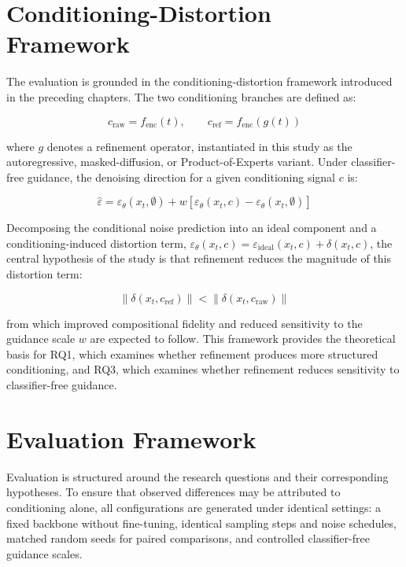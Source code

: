\documentclass[a4paper,twoside,12pt]{report}
\begin{document}
\section{Conditioning-Distortion Framework}
\label{sec:distortion}

The evaluation is grounded in the conditioning-distortion framework introduced
in the preceding chapters. The two conditioning branches are defined as:

\begin{equation}
c_{\mathrm{raw}} = f_{\mathrm{enc}}(t),
\qquad
c_{\mathrm{ref}} = f_{\mathrm{enc}}\!\left(g(t)\right)
\label{eq:conditioning_pair}
\end{equation}

where \(g\) denotes a refinement operator, instantiated in this study as the
autoregressive, masked-diffusion, or Product-of-Experts variant. Under
classifier-free guidance, the denoising direction for a given conditioning
signal \(c\) is:

\begin{equation}
\hat{\varepsilon}
= \varepsilon_\theta(x_t,\emptyset)
+ w\left[\varepsilon_\theta(x_t,c) - \varepsilon_\theta(x_t,\emptyset)\right]
\end{equation}

Decomposing the conditional noise prediction into an ideal component and a
conditioning-induced distortion term, \(\varepsilon_\theta(x_t,c) =
\varepsilon_{\mathrm{ideal}}(x_t,c) + \delta(x_t,c)\), the central hypothesis of
the study is that refinement reduces the magnitude of this distortion term:

\begin{equation}
\left\| \delta\!\left(x_t,c_{\mathrm{ref}}\right) \right\|
<
\left\| \delta\!\left(x_t,c_{\mathrm{raw}}\right) \right\|
\label{eq:hypothesis}
\end{equation}

from which improved compositional fidelity and reduced sensitivity to the
guidance scale \(w\) are expected to follow. This framework provides the
theoretical basis for RQ1, which examines whether refinement produces more
structured conditioning, and RQ3, which examines whether refinement reduces
sensitivity to classifier-free guidance.

\section{Evaluation Framework}
\label{sec:eval}

Evaluation is structured around the research questions and their corresponding
hypotheses. To ensure that observed differences may be attributed to
conditioning alone, all configurations are generated under identical settings:
a fixed backbone without fine-tuning, identical sampling steps and noise
schedules, matched random seeds for paired comparisons, and controlled
classifier-free guidance scales.
\end{document}
